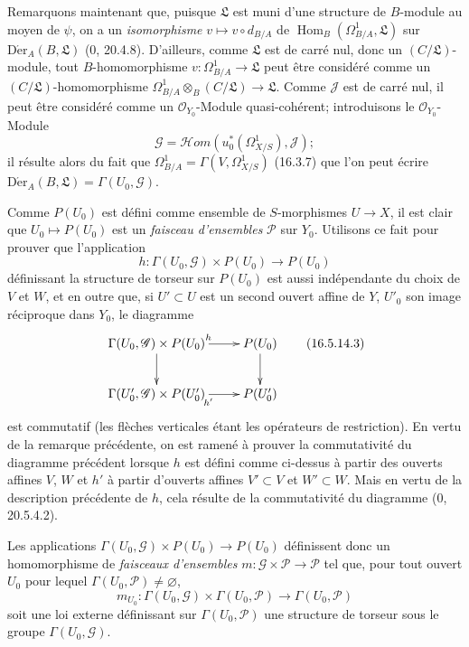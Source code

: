 \begin{env}[16.5.14]
Remarquons maintenant que, puisque $\mathfrak{L}$ est muni d'une structure de
$B$-module au moyen de $\psi$, on a un \emph{isomorphisme}
$v\mapsto v\circ d_{B/A}$ de
$\operatorname{Hom}_B(\Omega_{B/A}^1,\mathfrak{L})$ sur
$\operatorname{D\acute{e}r}_A(B,\mathfrak{L})$ (0, 20.4.8). D'ailleurs, comme
$\mathfrak{L}$ est de carré nul, donc un $(C/\mathfrak{L})$-module, tout
$B$-homomorphisme $v:\Omega_{B/A}^1\to\mathfrak{L}$ peut être considéré
comme un $(C/\mathfrak{L})$-homomorphisme
$\Omega_{B/A}^1\otimes_B(C/\mathfrak{L})\to\mathfrak{L}$. Comme
$\mathscr{J}$ est de carré nul, il peut être considéré comme un
$\mathcal{O}_{Y_0}$-Module quasi-cohérent; introduisons le
$\mathcal{O}_{Y_0}$-Module
\[
  \mathscr{G}=\mathscr{H}om(u_0^*(\Omega_{X/S}^1),\mathscr{J});
  \tag{16.5.14.2}
  \label{IV.16.5.14.2}
\]
il résulte alors du fait que
$\Omega_{B/A}^1=\Gamma(V,\Omega_{X/S}^1)$ (16.3.7) que l'on peut écrire
$\operatorname{D\acute{e}r}_A(B,\mathfrak{L})=\Gamma(U_0,\mathscr{G})$.

Comme $P(U_0)$ est défini comme ensemble de $S$-morphismes $U\to X$, il est
clair que $U_0\mapsto P(U_0)$ est un \emph{faisceau d'ensembles}
$\mathscr{P}$ sur $Y_0$. Utilisons ce fait pour prouver que l'application
\[
  h:\Gamma(U_0,\mathscr{G})\times P(U_0)\longrightarrow P(U_0)
\]
définissant la structure de torseur sur $P(U_0)$ est aussi indépendante du
choix de $V$ et $W$, et en outre que, si $U'\subset U$ est un second ouvert
affine de $Y$, $U'_0$ son image réciproque dans $Y_0$, le diagramme
\[
  \xymatrix{
    \Gamma(U_0,\mathscr{G})\times P(U_0)\ar[d]\ar[r]^h
      & P(U_0)\ar[d]\\
    \Gamma(U'_0,\mathscr{G})\times P(U'_0)\ar[r]_{h'}
      & P(U'_0)
  }
  \tag{16.5.14.3}
  \label{IV.16.5.14.3}
\]
est commutatif (les flèches verticales étant les opérateurs de restriction).
En vertu de la remarque précédente, on est ramené à prouver la commutativité
du diagramme précédent lorsque $h$ est défini comme ci-dessus à partir des
ouverts affines $V$, $W$ et $h'$ à partir d'ouverts
affines $V'\subset V$ et $W'\subset W$. Mais en vertu de la description
précédente de $h$, cela résulte de la commutativité du diagramme (0, 20.5.4.2).

Les applications
$\Gamma(U_0,\mathscr{G})\times P(U_0)\to P(U_0)$ définissent donc un
homomorphisme de \emph{faisceaux d'ensembles}
$m:\mathscr{G}\times\mathscr{P}\to\mathscr{P}$ tel que, pour tout ouvert
$U_0$ pour lequel $\Gamma(U_0,\mathscr{P})\neq\varnothing$,
\[
  m_{U_0}:\Gamma(U_0,\mathscr{G})\times\Gamma(U_0,\mathscr{P})
  \longrightarrow\Gamma(U_0,\mathscr{P})
\]
soit une loi externe définissant sur $\Gamma(U_0,\mathscr{P})$ une structure
de torseur sous le groupe $\Gamma(U_0,\mathscr{G})$.
\end{env}

